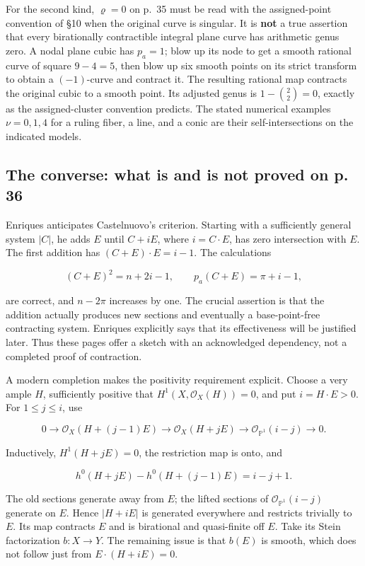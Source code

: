 For the second kind, \(\varrho=0\) on p.~35 must be read with the assigned-point convention of §10 when the original curve is singular. It is \textbf{not} a true assertion that every birationally contractible integral plane curve has arithmetic genus zero. A nodal plane cubic has \(p_a=1\); blow up its node to get a smooth rational curve of square \(9-4=5\), then blow up six smooth points on its strict transform to obtain a \((-1)\)-curve and contract it. The resulting rational map contracts the original cubic to a smooth point. Its adjusted genus is \(1-\binom22=0\), exactly as the assigned-cluster convention predicts. The stated numerical examples \(\nu=0,1,4\) for a ruling fiber, a line, and a conic are their self-intersections on the indicated models.

\subsection{The converse: what is and is not proved on p. 36}

Enriques anticipates Castelnuovo's criterion. Starting with a sufficiently general system \(|C|\), he adds \(E\) until \(C+iE\), where \(i=C\cdot E\), has zero intersection with \(E\). The first addition has \((C+E)\cdot E=i-1\). The calculations

\[
(C+E)^2=n+2i-1,\qquad
p_a(C+E)=\pi+i-1,
\]

are correct, and \(n-2\pi\) increases by one. The crucial assertion is that the addition actually produces new sections and eventually a base-point-free contracting system. Enriques explicitly says that its effectiveness will be justified later. Thus these pages offer a sketch with an acknowledged dependency, not a completed proof of contraction.

A modern completion makes the positivity requirement explicit. Choose a very ample \(H\), sufficiently positive that \(H^1(X,\mathcal O_X(H))=0\), and put \(i=H\cdot E>0\). For \(1\le j\le i\), use

\[
0\to\mathcal O_X(H+(j-1)E)\to\mathcal O_X(H+jE)
\to\mathcal O_{\mathbb P^1}(i-j)\to0.
\]

Inductively, \(H^1(H+jE)=0\), the restriction map is onto, and

\[
h^0(H+jE)-h^0(H+(j-1)E)=i-j+1.
\]

The old sections generate away from \(E\); the lifted sections of \(\mathcal O_{\mathbb P^1}(i-j)\) generate on \(E\). Hence \(|H+iE|\) is generated everywhere and restricts trivially to \(E\). Its map contracts \(E\) and is birational and quasi-finite off \(E\). Take its Stein factorization \(b:X\to Y\). The remaining issue is that \(b(E)\) is smooth, which does not follow just from \(E\cdot(H+iE)=0\).

